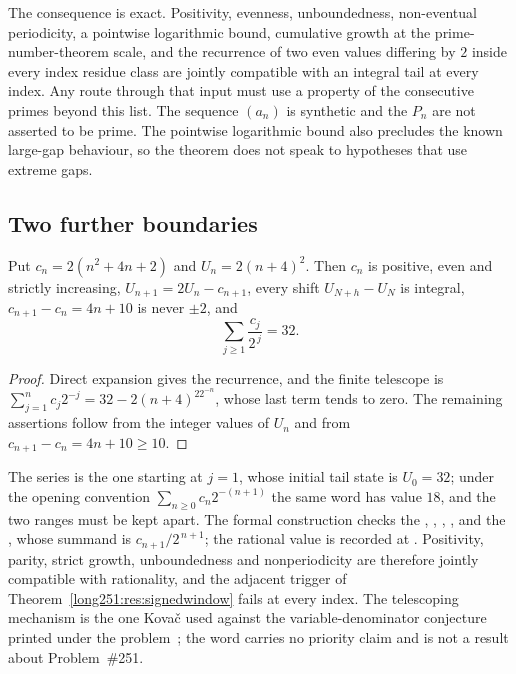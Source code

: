 The consequence is exact.  Positivity, evenness, unboundedness, non-eventual
periodicity, a pointwise logarithmic bound, cumulative growth at the
prime-number-theorem scale, and the recurrence of two even values differing by
$2$ inside every index residue class are jointly compatible with an integral
tail at every index.  Any route through that input must use a property of the
consecutive primes beyond this list.  The sequence $(a_n)$ is synthetic and the
$P_n$ are not asserted to be prime.  The pointwise logarithmic bound also
precludes the known large-gap behaviour, so the theorem does not speak to
hypotheses that use extreme gaps.

\subsection{Two further boundaries}

\begin{proposition}\label{long251:res:polynomialcountermodel}
Put $c_n=2(n^2+4n+2)$ and $U_n=2(n+4)^2$.  Then $c_n$ is positive, even and
strictly increasing, $U_{n+1}=2U_n-c_{n+1}$, every shift $U_{N+h}-U_N$ is
integral, $c_{n+1}-c_n=4n+10$ is never $\pm2$, and
\[
 \sum_{j\ge1}\frac{c_j}{2^{\,j}}=32 .
\]
\end{proposition}

\begin{proof}
Direct expansion gives the recurrence, and the finite telescope is
$\sum_{j=1}^{n}c_j2^{-j}=32-2(n+4)^22^{-n}$, whose last term tends to zero.
The remaining assertions follow from the integer values of $U_n$ and from
$c_{n+1}-c_n=4n+10\ge10$.
\end{proof}

\noindent The series is the one starting at $j=1$, whose initial tail state is
$U_0=32$; under the opening convention $\sum_{n\ge0}c_n2^{-(n+1)}$ the same
word has value $18$, and the two ranges must be kept apart.  The formal
construction checks the
,
,
,
, and the
, whose summand is $c_{n+1}/2^{\,n+1}$; the
rational value is recorded at
.
Positivity, parity, strict growth, unboundedness and nonperiodicity are
therefore jointly compatible with rationality, and the adjacent trigger of
Theorem~\ref{long251:res:signedwindow} fails at every index.  The telescoping mechanism
is the one Kova\v{c} used against the variable-denominator conjecture printed
under the problem~\cite[Theorem~1 and proof, pp.~1--2]{kovac2026}; the word
carries no priority claim and is not a result about Problem~\#251.

